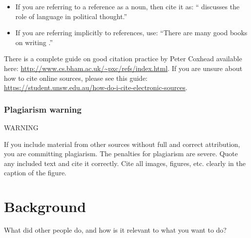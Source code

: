 \documentclass{l4proj}
\begin{document}
\begin{itemize}
\item If you are referring to a reference as a noun, then cite it as: ``\citet{Orw68} discusses the role of language in political thought.''
\item If you are referring implicitly to references, use: ``There are many good books on writing \citep{Orw68, Wil09, Pin15}.''
\end{itemize}

There is a complete guide on good citation practice by Peter Coxhead available here: \url{http://www.cs.bham.ac.uk/~pxc/refs/index.html}. 
If you are unsure about how to cite online sources, please see this guide: \url{https://student.unsw.edu.au/how-do-i-cite-electronic-sources}.

\subsection{Plagiarism warning}

\begin{highlight_title}{WARNING}
    
    If you include material from other sources without full and correct attribution, you are committing plagiarism. The penalties for plagiarism are severe.
    Quote any included text and cite it correctly. Cite all images, figures, etc. clearly in the caption of the figure.
\end{highlight_title}


\chapter{Background}
\label{chap:back}
What did other people do, and how is it relevant to what you want to do?
\end{document}
